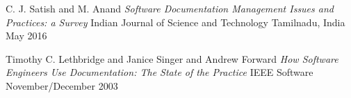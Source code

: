 \documentclass[landscape]{sciposter}
\begin{document}
\begin{thebibliography}{9}

    C. J. Satish and M. Anand
    \textit{Software Documentation Management Issues and Practices: a Survey}
    Indian Journal of Science and Technology
    Tamilnadu, India
    May 2016

    Timothy C. Lethbridge and Janice Singer and Andrew Forward
    \textit{How Software Engineers Use Documentation: The State of the Practice}
    IEEE Software
    November/December 2003



\end{thebibliography}
\end{document}
